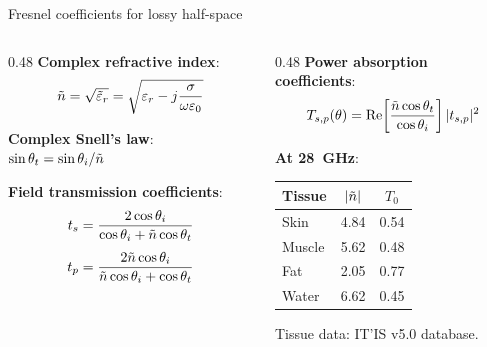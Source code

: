 \begin{frame}[label=app-p1-fresnel]{Fresnel coefficients for lossy half-space}

  \begin{columns}[T]
    \begin{column}{0.48\textwidth}
      \textbf{Complex refractive index}:
      \[
        \tilde{n} = \sqrt{\tilde{\varepsilon}_r} = \sqrt{\varepsilon_r - j\frac{\sigma}{\omega\varepsilon_0}}
      \]

      \textbf{Complex Snell's law}: $\sin\theta_t = \sin\theta_i / \tilde{n}$

      \vspace{4pt}
      \textbf{Field transmission coefficients}:
      \begin{align*}
        t_s &= \frac{2\cos\theta_i}{\cos\theta_i + \tilde{n}\cos\theta_t} \\[4pt]
        t_p &= \frac{2\tilde{n}\cos\theta_i}{\tilde{n}\cos\theta_i + \cos\theta_t}
      \end{align*}
    \end{column}

    \begin{column}{0.48\textwidth}
      \textbf{Power absorption coefficients}:
      \[
        T_{s,p}(\theta) = \operatorname{Re}\!\left[\frac{\tilde{n}\cos\theta_t}{\cos\theta_i}\right] |t_{s,p}|^2
      \]

      \vspace{4pt}
      \textbf{At \SI{28}{\giga\hertz}}:

      {\small
      \begin{tabular}{lcc}
        \toprule
        Tissue & $|\tilde{n}|$ & $T_0$ \\
        \midrule
        Skin   & 4.84 & 0.54 \\
        Muscle & 5.62 & 0.48 \\
        Fat    & 2.05 & 0.77 \\
        Water  & 6.62 & 0.45 \\
        \bottomrule
      \end{tabular}
      }

      \vspace{4pt}
      {\footnotesize Tissue data: IT'IS v5.0 database.}
    \end{column}
  \end{columns}

  \vspace{4pt}
  \quad{}
\end{frame}

